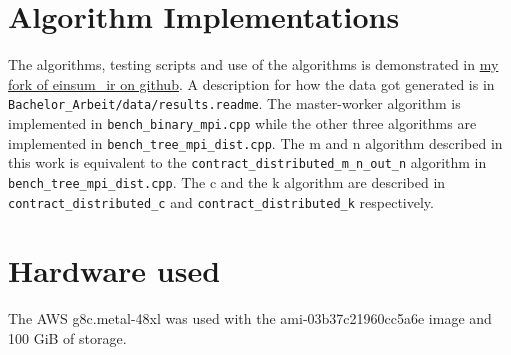 \appendix

\section{Algorithm Implementations}

The algorithms, testing scripts and use of the algorithms is demonstrated in 
\href{https://github.com/Minutenreis/einsum_ir}{my fork of einsum\_ir on github}.
A description for how the data got generated is in \\
\texttt{Bachelor\_Arbeit/data/results.readme}.
The master-worker algorithm is implemented in \texttt{bench\_binary\_mpi.cpp} while the other three algorithms are implemented in \texttt{bench\_tree\_mpi\_dist.cpp}.
The m and n algorithm described in this work is equivalent to the \texttt{contract\_distributed\_m\_n\_out\_n} algorithm in \texttt{bench\_tree\_mpi\_dist.cpp}.
The c and the k algorithm are described in\\ \texttt{contract\_distributed\_c} and \texttt{contract\_distributed\_k} respectively.

\section{Hardware used}

The AWS g8c.metal-48xl was used with the ami-03b37c21960cc5a6e image and 100 GiB of storage.
